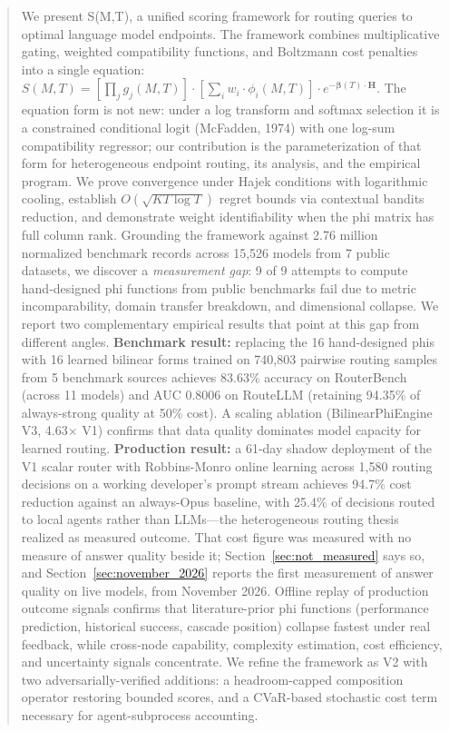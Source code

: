 \documentclass[11pt,a4paper]{article}
\newcommand{\smt}{S(M,T)}
\newcommand{\phii}{\phi_i}
\newcommand{\betavec}{\boldsymbol{\beta}}
\begin{document}
\begin{abstract}
\noindent
We present S(M,T), a unified scoring framework for routing queries to optimal language model endpoints. The framework combines multiplicative gating, weighted compatibility functions, and Boltzmann cost penalties into a single equation: $\smt = \left[\prod_j g_j(M,T)\right] \cdot \left[\sum_i w_i \cdot \phii(M,T)\right] \cdot e^{-\betavec(T) \cdot \mathbf{H}}$. The equation form is not new: under a log transform and softmax selection it is a constrained conditional logit (McFadden, 1974) with one log-sum compatibility regressor; our contribution is the parameterization of that form for heterogeneous endpoint routing, its analysis, and the empirical program. We prove convergence under Hajek conditions with logarithmic cooling, establish $O(\sqrt{KT\log T})$ regret bounds via contextual bandits reduction, and demonstrate weight identifiability when the phi matrix has full column rank. Grounding the framework against 2.76 million normalized benchmark records across 15,526 models from 7 public datasets, we discover a \textit{measurement gap}: 9 of 9 attempts to compute hand-designed phi functions from public benchmarks fail due to metric incomparability, domain transfer breakdown, and dimensional collapse. We report two complementary empirical results that point at this gap from different angles. \textbf{Benchmark result:} replacing the 16 hand-designed phis with 16 learned bilinear forms trained on 740,803 pairwise routing samples from 5 benchmark sources achieves 83.63\% accuracy on RouterBench (across 11 models) and AUC 0.8006 on RouteLLM (retaining 94.35\% of always-strong quality at 50\% cost). A scaling ablation (BilinearPhiEngine V3, 4.63$\times$ V1) confirms that data quality dominates model capacity for learned routing. \textbf{Production result:} a 61-day shadow deployment of the V1 scalar router with Robbins-Monro online learning across 1,580 routing decisions on a working developer's prompt stream achieves 94.7\% cost reduction against an always-Opus baseline, with 25.4\% of decisions routed to local agents rather than LLMs---the heterogeneous routing thesis realized as measured outcome. That cost figure was measured with no measure of answer quality beside it; Section~\ref{sec:not_measured} says so, and Section~\ref{sec:november_2026} reports the first measurement of answer quality on live models, from November 2026. Offline replay of production outcome signals confirms that literature-prior phi functions (performance prediction, historical success, cascade position) collapse fastest under real feedback, while cross-node capability, complexity estimation, cost efficiency, and uncertainty signals concentrate. We refine the framework as V2 with two adversarially-verified additions: a headroom-capped composition operator restoring bounded scores, and a CVaR-based stochastic cost term necessary for agent-subprocess accounting.
\end{abstract}
\end{document}
